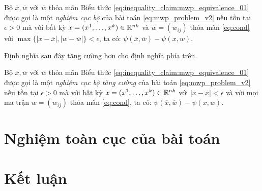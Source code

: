 \documentclass[a4paper]{report}
\begin{document}
    \begin{definition}
        Bộ $\overline{x}, \overline{w}$ với $\overline{w}$ thỏa mãn Biểu thức \eqref{eq:inequality_claim:mwp_equivalence_01} được gọi là một \emph{nghiệm cục bộ} của bài toán \eqref{eq:mwp_problem_v2} nếu tồn tại $\epsilon > 0$ mà với bất kỳ $x = (x^1, \dots, x^k) \in \mathbb{R}^{nk}$ và $w = (w_{ij})$ thỏa mãn \eqref{eq:cond} với $\max\{\left|x - \overline{x}\right|, \left|w - \overline{w}\right|\} < \epsilon$, ta có: $\psi(\overline{x}, \overline{w}) - \psi({x}, {w})$.
    \end{definition}

    Định nghĩa sau đây tăng cường hơn cho định nghĩa phía trên.
    \begin{definition}
        Bộ $\overline{x}, \overline{w}$ với $\overline{w}$ thỏa mãn Biểu thức \eqref{eq:inequality_claim:mwp_equivalence_01} được gọi là một \emph{nghiệm cục bộ tăng cường} của bài toán \eqref{eq:mwp_problem_v2} nếu tồn tại $\epsilon > 0$ mà với bất kỳ $x = (x^1, \dots, x^k) \in \mathbb{R}^{nk}$ với $\left|x - \overline{x}\right| < \epsilon$ và với mọi ma trận $w = (w_{ij})$ thỏa mãn \eqref{eq:cond}, ta có: $\psi(\overline{x}, \overline{w}) - \psi({x}, {w})$.
    \end{definition}

    

    \chapter{Nghiệm toàn cục của bài toán}
    \label{sec:global_solutions}


    \chapter{Kết luận}
    

\end{document}

